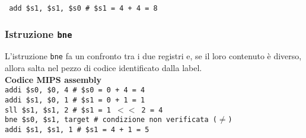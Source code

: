 \documentclass[../main.tex]{subfiles}
\begin{document}
\texttt{\hspace*{0cm} \hspace*{0cm} add \$s1, \$s1, \$s0 \hspace*{0cm} \hspace*{0cm} \# \$s1 = 4 + 4 = 8}

\vspace*{2mm}

\subsubsection{Istruzione \texttt{bne}}
L'istruzione \texttt{bne} fa un confronto tra i due registri e, se il loro contenuto
è diverso, allora salta nel pezzo di codice identificato dalla label.
\\[2mm]
\textbf{Codice MIPS assembly} \\
\texttt{addi \$s0, \$0, 4 \hspace*{0cm} \hspace*{0cm} \hspace*{0cm} \hspace*{0cm} \hspace*{0cm} \hspace*{0cm} \# \$s0 = 0 + 4 = 4} \\
\texttt{addi \$s1, \$0, 1 \hspace*{0cm} \hspace*{0cm} \hspace*{0cm} \hspace*{0cm} \hspace*{0cm} \hspace*{0cm} \# \$s1 = 0 + 1 = 1} \\
\texttt{sll \$s1, \$s1, 2 \hspace*{0cm} \hspace*{0cm} \hspace*{0cm} \hspace*{0cm} \hspace*{0cm} \hspace*{0cm} \# \$s1 = 1 $<<$ 2 = 4} \\
\texttt{bne \$s0, \$s1, target \hspace*{0cm} \# condizione non verificata ($\neq$)} \\
\texttt{addi \$s1, \$s1, 1 \hspace*{0cm} \hspace*{0cm} \hspace*{0cm} \hspace*{0cm} \hspace*{0cm} \# \$s1 = 4 + 1 = 5} \\
\end{document}
